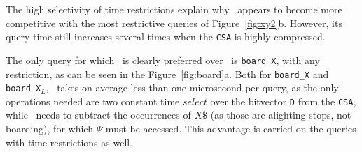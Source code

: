     The high selectivity of time restrictions explain why \ttctr~appears to become more competitive with the most restrictive queries of Figure~\ref{fig:xy2}b. However, its query time still increases several times when the \texttt{CSA} is highly compressed.
    
    The only query for which \ttctr~is clearly preferred over \ctr~is \texttt{board\_X}, with any restriction, as can be seen in the Figure~\ref{fig:board}a. Both for \texttt{board\_X} and \texttt{board\_X$_{L}$}, \ttctr~takes on average less than one microsecond per query, as the only operations needed are two constant time $select$ over the bitvector \texttt{D} from the \texttt{CSA}, while \ctr~needs to subtract the occurrences of $X\$$ (as those are alighting stops, not boarding), for which $\Psi$ must be accessed. This advantage is carried on the queries with time restrictions as well.
    
